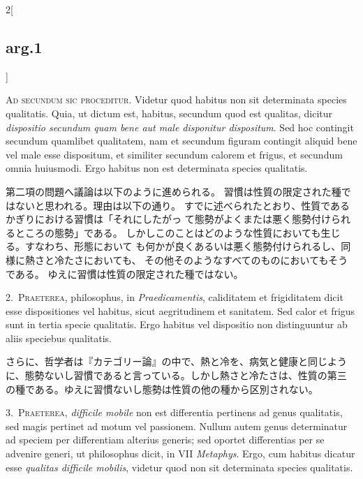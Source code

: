 \documentclass[paper=a4paper,fontsize=10pt,jafontsize=9pt,titlepage]{jlreq}
\begin{document}
\begin{paracol}{2}[\subsection{arg.1}]

{\scshape Ad secundum sic proceditur}. Videtur quod habitus non sit determinata
species qualitatis. Quia, ut dictum est, habitus, secundum quod est
qualitas, dicitur {\itshape dispositio secundum quam bene aut male disponitur
dispositum}. Sed hoc contingit secundum quamlibet qualitatem, nam et
secundum figuram contingit aliquid bene vel male esse dispositum, et
similiter secundum calorem et frigus, et secundum omnia
huiusmodi. Ergo habitus non est determinata species qualitatis.

\switchcolumn

第二項の問題へ議論は以下のように進められる。
習慣は性質の限定された種ではないと思われる。理由は以下の通り。
すでに述べられたとおり、性質であるかぎりにおける習慣は「それにしたがっ
て態勢がよくまたは悪く態勢付けられるところの態勢」である。
しかしこのことはどのような性質においても生じる。すなわち、形態において
も何かが良くあるいは悪く態勢付けられるし、同様に熱さと冷たさにおいても、
その他そのようなすべてのものにおいてもそうである。
ゆえに習慣は性質の限定された種ではない。


2.~{\scshape Praeterea}, philosophus, in {\itshape Praedicamentis}, caliditatem et frigiditatem
dicit esse dispositiones vel habitus, sicut aegritudinem et
sanitatem. Sed calor et frigus sunt in tertia specie qualitatis. Ergo
habitus vel dispositio non distinguuntur ab aliis speciebus
qualitatis.

\switchcolumn

さらに、哲学者は『カテゴリー論』の中で、熱と冷を、病気と健康と同じよう
に、態勢ないし習慣であると言っている。しかし熱さと冷たさは、性質の第三
の種である。ゆえに習慣ないし態勢は性質の他の種から区別されない。


3.~{\scshape Praeterea}, {\itshape difficile mobile} non est differentia pertinens ad genus
qualitatis, sed magis pertinet ad motum vel passionem. Nullum autem
genus determinatur ad speciem per differentiam alterius generis; sed
oportet differentias per se advenire generi, ut philosophus dicit, in
VII {\itshape Metaphys}. Ergo, cum habitus dicatur esse {\itshape qualitas difficile
mobilis}, videtur quod non sit determinata species qualitatis.


\end{paracol}
\end{document}
